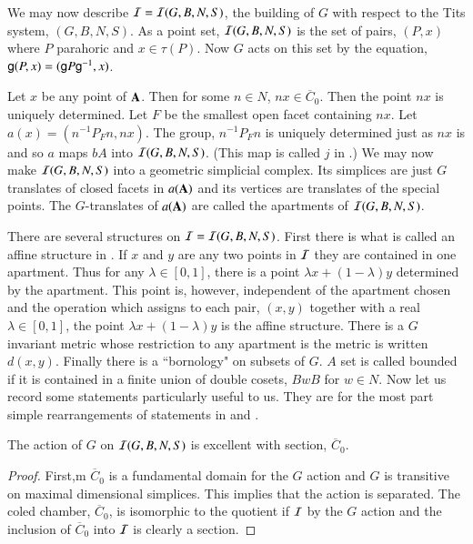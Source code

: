 We may now describe $\mathcal{I} = \mathcal{I}(G, B, N, S)$, the building of $G$ with respect to the Tits system, $(G, B, N, S)$. As a point set, $\mathcal{I}(G, B, N, S)$ is the set of pairs, $(P, x)$ where $P$ parahoric and $x \in \tau(P)$. Now $G$ acts on this set by the equation, $\mathsf{g} (P, x) = (\mathsf{g} P \mathsf{g}^{-1}, x)$. 

Let $x$ be any point of $\mathbf{A}$. Then for some $n \in N$, $nx \in \overline{C}_{0}$. Then the point $nx$ is uniquely determined. Let $F$ be the smallest open facet containing $nx$.  Let $a(x) = (n^{-1} P_{F}n, nx)$. The group, $n^{-1}P_{F}n$ is uniquely determined just as $nx$ is and so $a$ maps $bA$ into $\mathcal{I}(G, B, N, S)$. (This map is called $j$ in \cite{art6-keyBT I}.) We may now make $\mathcal{I}(G, B, N, S)$ into a geometric simplicial complex. Its simplices are just $G$ translates of closed facets in $a(\mathbf{A})$ and its vertices are translates of the special points. The $G$-translates of $a(\mathbf{A})$ are called the apartments of $\mathcal{I}(G, B, N, S)$.

There are several structures on $\mathcal{I} = \mathcal{I}(G, B, N, S)$. First there is what is called an affine structure in \cite{art6-keyBT I}. If $x$ and $y$ are any two points in $\mathcal{I}$ they are contained in one apartment. Thus for any $\lambda \in [0,1]$, there is a  point $\lambda x + (1- \lambda)y$ determined by the apartment. This point is, however, independent of the apartment chosen and the operation which assigns to each pair, $(x, y)$ together with a real $\lambda \in [0,1]$, the point $\lambda x + (1-\lambda)y$ is the affine structure. There is a $G$ invariant metric whose restriction to any apartment is the metric is written $d(x, y)$. Finally there is a ``bornology" on subsets of $G$. $A$ set is called bounded if it is contained in a finite union of double cosets, $BwB$ for $w \in N$. Now let us record some statements particularly useful to us. They are for the most part simple rearrangements of statements in \cite{BT I} and \cite{BT II}. 

\begin{lem}\label{art6-lemma-10.1}
The action of $G$ on $\mathcal{I}(G, B, N, S)$ is excellent with section, $\overline{C}_{0}$.
\end{lem}

\begin{proof}
First,m $\overline{C}_{0}$ is a fundamental domain for the $G$ action and $G$ is transitive on maximal dimensional simplices. This implies that the action is separated. The coled chamber, $\overline{C}_{0}$, is isomorphic to the quotient if $\mathcal{I}$ by the $G$ action and the inclusion of $\overline{C}_{0}$ into $\mathcal{I}$ is clearly a section.
\end{proof}

